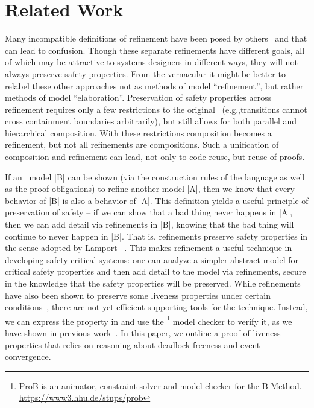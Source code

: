 
\section{Related Work}
\label{sec:relatedWork}

Many incompatible definitions of refinement have been posed by
others~\cite{Syriani_2019,Maraninchi91theargos} and that can lead to confusion.
Though these separate refinements have different goals, all of which may be
attractive to systems designers in different ways,
they will not always preserve safety properties.  
From the \EventB vernacular it might be better to relabel these other approaches
not as methods of model ``refinement'', but rather methods of model
``elaboration''.  
Preservation of safety properties across refinement requires only a few
restrictions to the original~\cite{Harel} \SCs (e.g.,transitions cannot cross
containment boundaries arbitrarily), but still allows for both parallel and
hierarchical composition. 
With these restrictions composition becomes a refinement, but not all
refinements are compositions.  
Such a unification of composition and refinement can lead, not only to code
reuse, but reuse of proofs.

If an \EventB\ model |B| can be shown (via the construction rules of the \EventB
language as well as the proof obligations) to refine another \EventB
model |A|, then we know that every behavior of |B| is also a behavior
of |A|. This definition yields a useful principle of preservation of
safety -- if we can show that a bad thing never happens in |A|, then
we can add detail via refinements in |B|, knowing that the bad thing
will continue to never happen in |B|. That is, \EventB refinements
preserve safety properties in the sense adopted by Lamport
~\cite{lamport1977proving}. This makes refinement a useful technique
in developing safety-critical systems: one can analyze a simpler
abstract model for critical safety properties and then add detail to
the model via refinements, secure in the knowledge that the safety
properties will be preserved. While \EventB refinements have also been
shown to preserve some liveness properties under certain
conditions~\cite{hoang2016ltl}, there are not yet efficient supporting
tools for the technique. Instead, we can express the property in \LTL
and use the \PROB\footnote{ProB is an animator, constraint solver and
  model checker for the B-Method. \url{https://www3.hhu.de/stups/prob}}
model checker to verify it, as we have shown in previous
work~\cite{detect2020}.  In this paper, we outline a proof of liveness
properties that relies on reasoning about deadlock-freeness and event
convergence.

